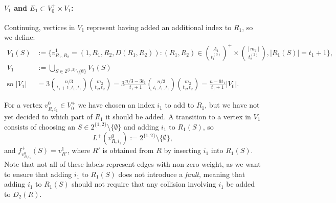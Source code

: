 \documentclass{article}
\renewcommand{\>}{\rangle}
\newcommand{\<}{\langle}
\renewcommand{\(}{\left(}
\renewcommand{\)}{\right)}
\begin{document}
\paragraph{$V_1$ and $E_1\subset V_0^+\times V_1$:} Continuing, vertices in $V_1$ represent having added an additional index to $R_1$, so we define:
\begin{align}
V_1(S) &:=\Bigg\{v^1_{R_1,R_2}=(1,R_1,R_2,D(R_1,R_2)): (R_1,R_2)\in\binom{A_1}{t_1^{(3)}}^+\times \binom{[m_2]}{t_2^{(2)}},|R_1(S)|=t_1+1\Bigg\},\nonumber\\
V_1 &:=\bigcup_{S\in 2^{\{1,2\}}\setminus\{\emptyset\}}V_1(S)\nonumber\\
\mbox{so }|V_1|&=3\binom{n/3}{t_1+1,t_1,t_1}\binom{m_2}{t_2,t_2}
= 3\frac{n/3-3t_1}{t_1+1}\binom{n/3}{t_1,t_1,t_1}\binom{m_2}{t_2,t_2}
= \frac{n-9t_1}{t_1+1}|V_0|.
\label{eq:V3}
\end{align}

For a vertex $v_{R,i_1}^0\in V_0^+$ we have chosen an index $i_1$ to add to $R_1$, but we have not yet decided to which part of $R_1$ it should be added. A transition to a vertex in $V_1$ consists of choosing an $S \in 2^{\{1,2\}} \setminus \{\emptyset\}$ and adding $i_1$ to $R_1(S)$, so
$$L^+(v_{R,i_1}^0):=2^{\{1,2\}} \setminus \{\emptyset\},$$
and $f^+_{v_{R,i_1}^0}(S) = v^1_{R'}$, where $R'$ is obtained from $R$ by inserting $i_1$ into $R_1(S)$. Note that not all of these labels represent edges with non-zero weight, as we want to ensure that adding $i_1$ to $R_1(S)$ does not introduce a \emph{fault}, meaning that adding $i_1$ to $R_1(S)$ should not require that any collision involving $i_1$ be added to $D_2(R)$. 
\end{document}

